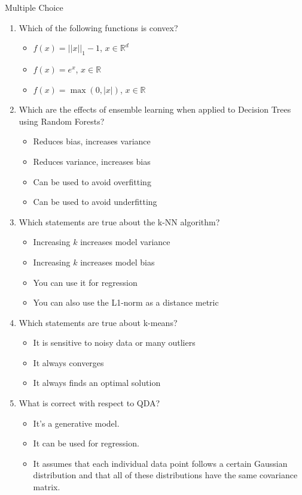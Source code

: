 \documentclass{article}
\begin{document}

\begin{exercise}{Multiple Choice}
  \begin{enumerate}
    \item Which of the following functions is convex?
      \begin{itemize}
        \item $f(x) = ||x||_1 - 1$, $x \in \mathbb{R}^d$
        \item $f(x) = e^x$, $x \in \mathbb{R}$
        \item $f(x) = \max(0, |x|)$, $x \in \mathbb{R}$
      \end{itemize}

    \item Which are the effects of ensemble learning when applied to Decision Trees using Random Forests?
      \begin{itemize}
        \item Reduces bias, increases variance
        \item Reduces variance, increases bias
        \item Can be used to avoid overfitting
        \item Can be used to avoid underfitting
      \end{itemize}

    \item Which statements are true about the k-NN algorithm?
      \begin{itemize}
        \item Increasing $k$ increases model variance
        \item Increasing $k$ increases model bias
        \item You can use it for regression
        \item You can also use the L1-norm as a distance metric
      \end{itemize}

    \item Which statements are true about k-means?
      \begin{itemize}
        \item It is sensitive to noisy data or many outliers
        \item It always converges
        \item It always finds an optimal solution
      \end{itemize}

    \item What is correct with respect to QDA?
      \begin{itemize}
        \item It's a generative model.
        \item It can be used for regression.
        \item It assumes that each individual data point follows a certain Gaussian distribution and that all of these distributions have the same covariance matrix.
      \end{itemize}


\end{enumerate}
\end{exercise}
\end{document}
